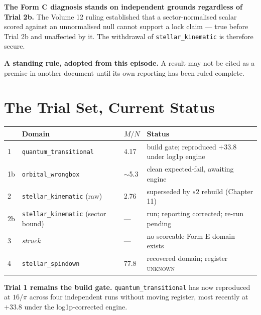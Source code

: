 \documentclass[11pt, letterpaper, openany]{book}
\newcommand{\MN}{M/N}
\begin{document}
\begin{rulingbox}
\textbf{The Form C diagnosis stands on independent grounds regardless of Trial 2b.} The Volume 12
ruling established that a sector-normalised scalar scored against an unnormalised null cannot
support a lock claim --- true before Trial 2b and unaffected by it. The withdrawal of
\texttt{stellar\_kinematic} is therefore secure. 
\end{rulingbox}

\begin{warningbox}
\textbf{A standing rule, adopted from this episode.} A result may not be cited as a premise in
another document until its own reporting has been ruled complete. 
\end{warningbox}

\section{The Trial Set, Current Status}

\begin{table}[H]
\centering
\small
\begin{tabular}{@{}llll@{}}
\toprule
& \textbf{Domain} & \textbf{$\MN$} & \textbf{Status} \\
\midrule
1 & \texttt{quantum\_transitional} & 4.17 & build gate; reproduced $+33.8$ under log1p engine \\
1b & \texttt{orbital\_wrongbox} & $\sim$5.3 & clean expected-fail, awaiting engine \\
2 & \texttt{stellar\_kinematic} (raw) & 2.76 & superseded by $s2$ rebuild (Chapter 11) \\
2b & \texttt{stellar\_kinematic} (sector bound) & --- & run; reporting corrected; re-run pending \\
3 & \emph{struck} & --- & no scoreable Form E domain exists \\
4 & \texttt{stellar\_spindown} & 77.8 & recovered domain; register \textsc{unknown} \\
\bottomrule
\end{tabular}
\end{table}

\begin{predictionbox}
\textbf{Trial 1 remains the build gate.} \texttt{quantum\_transitional} has now reproduced at
$16/\pi$ across four independent runs without moving register, most recently at $+33.8$ under the
log1p-corrected engine. 
\end{predictionbox}
\end{document}
